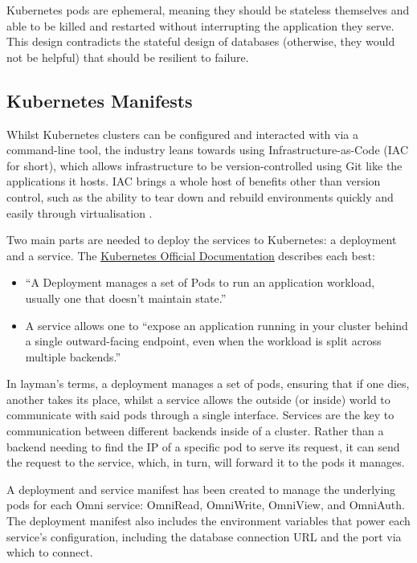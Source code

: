 Kubernetes pods are ephemeral, meaning they should be stateless themselves and able to be killed and restarted without interrupting the application they serve. 
This design contradicts the stateful design of databases (otherwise, they would not be helpful) that should be resilient to failure. 

\subsection{Kubernetes Manifests}
Whilst Kubernetes clusters can be configured and interacted with via a command-line tool, the industry leans towards using Infrastructure-as-Code (IAC for short), which allows infrastructure to be version-controlled using Git like the applications it hosts.
IAC brings a whole host of benefits other than version control, such as the ability to tear down and rebuild environments quickly and easily through virtualisation \citep{huttermann2012infrastructure}.

Two main parts are needed to deploy the services to Kubernetes: a deployment and a service. The \underline{\href{https://kubernetes.io/docs/home/}{Kubernetes Official Documentation}} \nocite{kubernetesdocs} describes each best:
\begin{itemize}
    \item ``A Deployment manages a set of Pods to run an application workload, usually one that doesn't maintain state.''
    \item A service allows one to ``expose an application running in your cluster behind a single outward-facing endpoint, even when the workload is split across multiple backends.''
\end{itemize}

In layman's terms, a deployment manages a set of pods, ensuring that if one dies, another takes its place, whilst a service allows the outside (or inside) world to communicate with said pods through a single interface.
Services are the key to communication between different backends inside of a cluster.
Rather than a backend needing to find the IP of a specific pod to serve its request, it can send the request to the service, which, in turn, will forward it to the pods it manages. 

A deployment and service manifest has been created to manage the underlying pods for each Omni service: OmniRead, OmniWrite, OmniView, and OmniAuth.
The deployment manifest also includes the environment variables that power each service's configuration, including the database connection URL and the port via which to connect.


